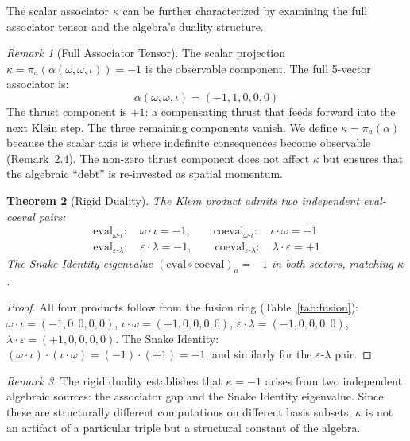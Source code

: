 \documentclass[12pt,oneside]{article}
\theoremstyle{principia}
\newtheorem{theorem}{Theorem}[section]
\theoremstyle{definition}
\theoremstyle{remark}
\newtheorem{remark}[theorem]{Remark}
\providecommand{\eps}{\varepsilon}
\providecommand{\lam}{\lambda}
\providecommand{\kap}{\kappa}
\begin{document}
The scalar associator $\kap$ can be further characterized by examining the full associator tensor and the algebra's duality structure.

\begin{remark}[Full Associator Tensor]
The scalar projection $\kap = \pi_a(\alpha(\omega, \omega, \iota)) = -1$ is the observable component. The full 5-vector associator is:
$$\alpha(\omega, \omega, \iota) = (-1, 1, 0, 0, 0)$$
The thrust component is $+1$: a compensating thrust that feeds forward into the next Klein step. The three remaining components vanish. We define $\kap = \pi_a(\alpha)$ because the scalar axis is where indefinite consequences become observable (Remark~2.4). The non-zero thrust component does not affect $\kap$ but ensures that the algebraic ``debt'' is re-invested as spatial momentum.
\end{remark}

\begin{theorem}[Rigid Duality]\label{thm:rigidity}
The Klein product admits two independent eval-coeval pairs:
\begin{align}
\mathrm{eval}_{\omega\text{-}\iota}: \quad \omega \cdot \iota = -1, \qquad
\mathrm{coeval}_{\omega\text{-}\iota}: \quad \iota \cdot \omega = +1 \\
\mathrm{eval}_{\eps\text{-}\lam}: \quad \eps \cdot \lam = -1, \qquad
\mathrm{coeval}_{\eps\text{-}\lam}: \quad \lam \cdot \eps = +1
\end{align}
The Snake Identity eigenvalue $(\mathrm{eval} \circ \mathrm{coeval})_a = -1$ in both sectors, matching $\kap$.
\end{theorem}

\begin{proof}
All four products follow from the fusion ring (Table~\ref{tab:fusion}): $\omega \cdot \iota = (-1,0,0,0,0)$, $\iota \cdot \omega = (+1,0,0,0,0)$, $\eps \cdot \lam = (-1,0,0,0,0)$, $\lam \cdot \eps = (+1,0,0,0,0)$. The Snake Identity: $(\omega \cdot \iota) \cdot (\iota \cdot \omega) = (-1) \cdot (+1) = -1$, and similarly for the $\eps$-$\lam$ pair. \qedhere
\end{proof}

\begin{remark}
The rigid duality establishes that $\kap = -1$ arises from two independent algebraic sources: the associator gap and the Snake Identity eigenvalue. Since these are structurally different computations on different basis subsets, $\kap$ is not an artifact of a particular triple but a structural constant of the algebra.
\end{remark}
\end{document}
